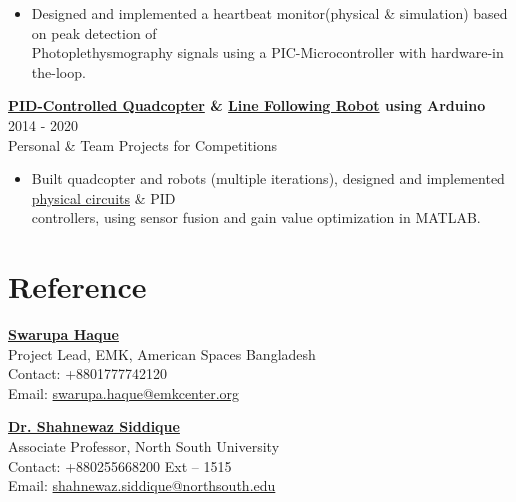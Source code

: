 \documentclass[11pt,a4paper]{article}
\newcommand{\researchexperienceitem}[3]{
  \textbf{#1} \hfill {\footnotesize{#3}} \\
  #2
}
\begin{document}
  \begin{itemize}
    \item Designed and implemented a heartbeat monitor(physical \& simulation) based on peak detection of \\Photoplethysmography signals using a PIC-Microcontroller with hardware-in the-loop.
  \end{itemize}
\researchexperienceitem{\href{https://drive.google.com/drive/folders/1uNBSVZH2_dy0_Oq0cVGIfgUmEq9-XBOY}{PID-Controlled Quadcopter} \& \href{https://drive.google.com/drive/folders/1gryL8Wh1tVB2gNVJjn_W8aFoTBzCbPA8?usp=sharing}{Line Following Robot} using Arduino}{Personal \& Team Projects for Competitions}{2014 - 2020}
  \begin{itemize}
    \item Built quadcopter and robots (multiple iterations), designed and implemented \href{https://oshwlab.com/anan.faiyaz/Atmega2560}{physical circuits} \& PID \\controllers, using sensor fusion and gain value optimization in MATLAB.
  \end{itemize}
\section*{Reference}

\hspace{0.01cm}
\textbullet{}
\hspace{0.01cm}
\begin{minipage}[t]{0.45\textwidth}
   \textbf{\href{https://emkcenter.org}{Swarupa Haque}} \\
  Project Lead, EMK, American Spaces Bangladesh \\
  Contact: +8801777742120 \\
  Email: \href{mailto:swarupa.haque@emkcenter.org}{swarupa.haque@emkcenter.org}
\end{minipage}
\hspace{0.4cm}
\textbullet{}
\hspace{0.01cm}
\begin{minipage}[t]{0.45\textwidth}
\textbf{\href{https://scholar.google.com/citations?user=6XLqr5QAAAAJ&hl=en}{Dr. Shahnewaz Siddique}} \\
  Associate Professor, North South University \\
  Contact: +880255668200 Ext -- 1515 \\
  Email: \href{mailto:shahnewaz.siddique@northsouth.edu}{shahnewaz.siddique@northsouth.edu}
\end{minipage}




\end{document}

